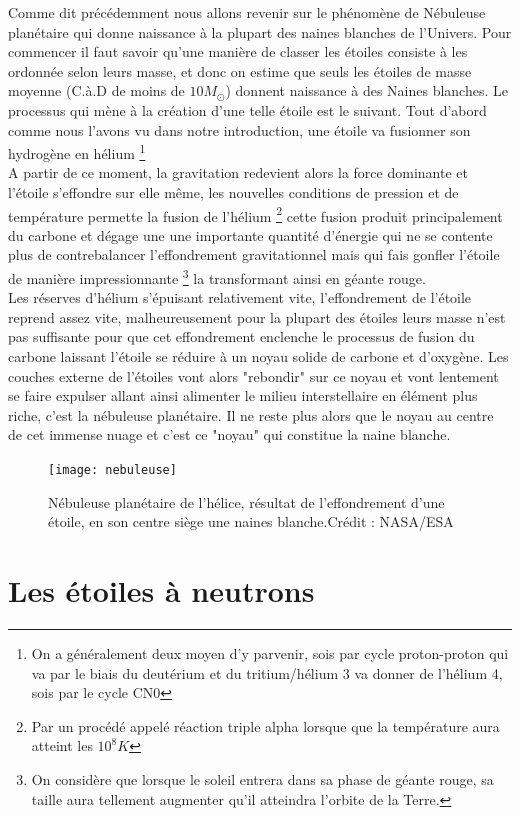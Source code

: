 \documentclass[11pt]{book} %
\begin{document}
Comme dit précédemment nous allons revenir sur le phénomène de Nébuleuse planétaire qui donne naissance à la plupart des naines blanches de l'Univers.\n
Pour commencer il faut savoir qu'une manière de classer les étoiles consiste à les ordonnée selon leurs masse, et donc on estime que seuls les étoiles de masse moyenne (C.à.D de moins de $10M_{\odot}$) donnent naissance à des Naines blanches. Le processus qui mène à la création d'une telle étoile est le suivant.\n
Tout d'abord comme nous l'avons vu dans notre introduction, une étoile va fusionner son hydrogène en hélium \footnote{On a généralement deux moyen d'y parvenir, sois par cycle proton-proton qui va par le biais du deutérium et du tritium/hélium 3 va donner de l'hélium 4, sois par le cycle CN0}\\
A partir de ce moment, la gravitation redevient alors la force dominante et l'étoile s’effondre sur elle même, les nouvelles conditions de pression et de température permette la fusion de l’hélium \footnote{Par un procédé appelé réaction triple alpha lorsque que la température aura atteint les $10^8 K$} cette fusion produit principalement du carbone et dégage une une importante quantité d'énergie qui ne se contente plus de contrebalancer l'effondrement gravitationnel mais qui fais gonfler l'étoile de manière impressionnante \footnote{On considère que lorsque le soleil entrera dans sa phase de géante rouge, sa taille aura tellement augmenter qu'il atteindra l'orbite de la Terre.} la transformant ainsi en géante rouge.\\
Les réserves d'hélium s’épuisant relativement vite, l’effondrement de l'étoile reprend assez vite, malheureusement pour la plupart des étoiles leurs masse n'est pas suffisante pour que cet effondrement enclenche le processus de fusion du carbone laissant l'étoile se réduire à un noyau solide de carbone et d'oxygène. Les couches externe de l'étoiles vont alors "rebondir" sur ce noyau et vont lentement se faire expulser allant ainsi alimenter le milieu interstellaire en élément plus riche, c'est la nébuleuse planétaire. Il ne reste plus alors que le noyau au centre de cet immense nuage et c'est ce "noyau" qui constitue la naine blanche.
\begin{figure}[h]
    \center
    \texttt{[image: nebuleuse]}
    \caption{Nébuleuse planétaire de l’hélice, résultat de l'effondrement d'une étoile, en son centre siège une naines blanche.\n Crédit : NASA/ESA}
\end{figure}

\section{Les étoiles à neutrons}
\end{document}
